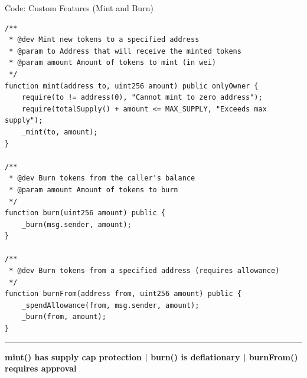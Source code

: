 \documentclass[8pt,aspectratio=169]{beamer}
\newcommand{\bottomnote}[1]{%
\vfill
\vspace{-2mm}
\textcolor{mllavender2}{\rule{\textwidth}{0.4pt}}
\vspace{1mm}
\footnotesize
\textbf{#1}
}
\begin{document}
\begin{frame}[t,fragile]{Code: Custom Features (Mint and Burn)}
\begin{lstlisting}[style=solidity]
/**
 * @dev Mint new tokens to a specified address
 * @param to Address that will receive the minted tokens
 * @param amount Amount of tokens to mint (in wei)
 */
function mint(address to, uint256 amount) public onlyOwner {
    require(to != address(0), "Cannot mint to zero address");
    require(totalSupply() + amount <= MAX_SUPPLY, "Exceeds max supply");
    _mint(to, amount);
}

/**
 * @dev Burn tokens from the caller's balance
 * @param amount Amount of tokens to burn
 */
function burn(uint256 amount) public {
    _burn(msg.sender, amount);
}

/**
 * @dev Burn tokens from a specified address (requires allowance)
 */
function burnFrom(address from, uint256 amount) public {
    _spendAllowance(from, msg.sender, amount);
    _burn(from, amount);
}
\end{lstlisting}

\bottomnote{mint() has supply cap protection | burn() is deflationary | burnFrom() requires approval}
\end{frame}
\end{document}
